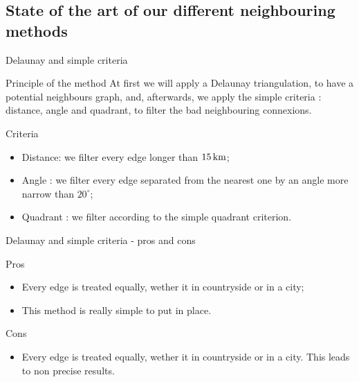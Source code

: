 \subsection{State of the art of our different neighbouring methods}
\insertsubsectionframe

\begin{frame}{Delaunay and simple criteria}
    \begin{block}{Principle of the method}
        At first we will apply a Delaunay triangulation, to have a potential neighbours graph, and, afterwards, we apply the simple criteria : distance, angle and quadrant,
        to filter the bad neighbouring connexions.
    \end{block}

    \begin{block}{Criteria}
        \begin{itemize}
            \item Distance: we filter every edge longer than $\unit[15]{km}$;
            \item Angle : we filter every edge separated from the nearest one by an angle more narrow than $20^\circ$;
            \item Quadrant : we filter according to the simple quadrant criterion.
        \end{itemize}
    \end{block}
\end{frame}

\begin{frame}{Delaunay and simple criteria - pros and cons}
    \begin{block}{Pros}
        \begin{itemize}
            \item Every edge is treated equally, wether it in countryside or in a city;
            \item This method is really simple to put in place.
        \end{itemize}
    \end{block}

    \begin{block}{Cons}
        \begin{itemize}
            \item Every edge is treated equally, wether it in countryside or in a city. This leads to non precise results.
        \end{itemize}
    \end{block}
\end{frame}

